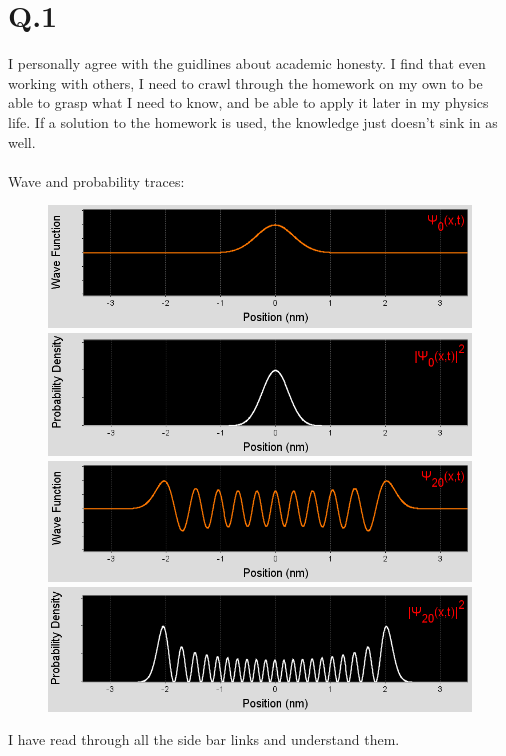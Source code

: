 \documentclass[a4paper,12pt]{article}
\begin{document}
\section*{Q.1}
I personally agree with the guidlines about academic honesty.  I find that even working with others, I need to crawl through the homework on my own to be able to grasp what I need to know, and be able to apply it later in my physics life.  If a solution to the homework is used, the knowledge just doesn't sink in as well. 
\\ \\
Wave and probability traces:\\
\begin{figure}[h]
\centering
\includegraphics[width=5in]{Ground_Wave.png}
\includegraphics[width=5in]{Ground_Probability.png}
\includegraphics[width=5in]{20_Wave.png}
\includegraphics[width=5in]{20_Probability.png}
\end{figure}
I have read through all the side bar links and understand them.
\end{document}
